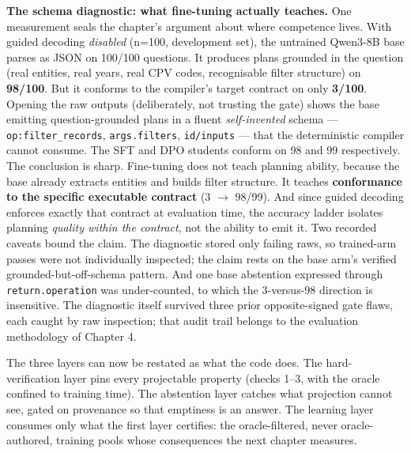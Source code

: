 \textbf{The schema diagnostic: what fine-tuning actually teaches.} One measurement seals the chapter's argument about where competence lives. With guided decoding \emph{disabled} (n=100, development set), the untrained Qwen3-8B base parses as JSON on 100/100 questions. It produces plans grounded in the question (real entities, real years, real CPV codes, recognisable filter structure) on \textbf{98/100}. But it conforms to the compiler's target contract on only \textbf{3/100}. Opening the raw outputs (deliberately, not trusting the gate) shows the base emitting question-grounded plans in a fluent \emph{self-invented} schema --- \texttt{op:filter\_records}, \texttt{args.filters}, \texttt{id/inputs} --- that the deterministic compiler cannot consume. The SFT and DPO students conform on 98 and 99 respectively. The conclusion is sharp. Fine-tuning does not teach planning ability, because the base already extracts entities and builds filter structure. It teaches \textbf{conformance to the specific executable contract} (3 $\rightarrow$ 98/99). And since guided decoding enforces exactly that contract at evaluation time, the accuracy ladder isolates planning \emph{quality within the contract}, not the ability to emit it. Two recorded caveats bound the claim. The diagnostic stored only failing raws, so trained-arm passes were not individually inspected; the claim rests on the base arm's verified grounded-but-off-schema pattern. And one base abstention expressed through \texttt{return.operation} was under-counted, to which the 3-versus-98 direction is insensitive. The diagnostic itself survived three prior opposite-signed gate flaws, each caught by raw inspection; that audit trail belongs to the evaluation methodology of Chapter 4.

The three layers can now be restated as what the code does. The hard-verification layer pins every projectable property (checks 1--3, with the oracle confined to training time). The abstention layer catches what projection cannot see, gated on provenance so that emptiness is an answer. The learning layer consumes only what the first layer certifies: the oracle-filtered, never oracle-authored, training pools whose consequences the next chapter measures.
